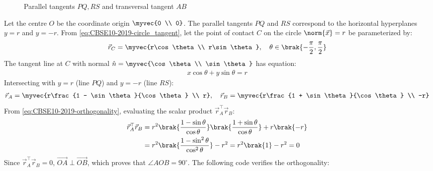 \begin{enumerate}[label=\thesubsection.\arabic*, ref=\thesubsection.\theenumi]
\begin{figure}[H]
		\caption{Parallel tangents $PQ, RS$ and transversal tangent $AB$}
		\label{fig:EE26BTECH11223-10-24}
	\end{figure}
	
	\solution
	Let the centre $O$ be the coordinate origin $\myvec{0 \\ 0}$.
	The parallel tangents $PQ$ and $RS$ correspond to the horizontal hyperplanes $y = r$ and $y = -r$.
	From \eqref{eq:CBSE10-2019-circle_tangent}, let the point of contact $C$ on the circle $\norm{\vec{x}} = r$ be parameterized by:
	\begin{align}
		\vec{r}_C = \myvec{r\cos\theta \\ r\sin\theta}, \quad \theta \in \brak{-\frac{\pi}{2}, \frac{\pi}{2}}
	\end{align}
	The tangent line at $C$ with normal $\hat{n} = \myvec{\cos\theta \\ \sin\theta}$ has equation:
	\begin{align}
		x\cos\theta + y\sin\theta = r
	\end{align}
	Intersecting with $y = r$ (line $PQ$) and $y = -r$ (line $RS$):
	\begin{align}
		\vec{r}_A = \myvec{r\frac{1 - \sin\theta}{\cos\theta} \\ r}, \quad \vec{r}_B = \myvec{r\frac{1 + \sin\theta}{\cos\theta} \\ -r}
	\end{align}
	From \eqref{eq:CBSE10-2019-orthogonality}, evaluating the scalar product $\vec{r}_A^\top \vec{r}_B$:
	\begin{align}
		\vec{r}_A^\top \vec{r}_B &= r^2 \brak{\frac{1 - \sin\theta}{\cos\theta}}\brak{\frac{1 + \sin\theta}{\cos\theta}} + r\brak{-r} \\
		&= r^2 \brak{\frac{1 - \sin^2\theta}{\cos^2\theta}} - r^2 = r^2\brak{1} - r^2 = 0
	\end{align}
	Since $\vec{r}_A^\top \vec{r}_B = 0$, $\vec{OA} \perp \vec{OB}$, which proves that $\angle AOB = 90^\circ$.
	The following code verifies the orthogonality:


\end{enumerate}
